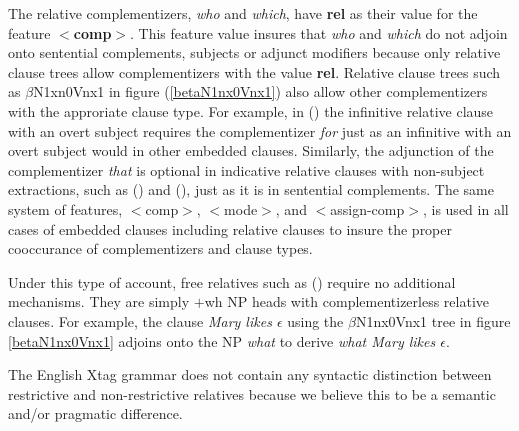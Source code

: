 The relative complementizers, {\it who} and {\it which}, have {\bf
rel} as their value for the feature {\bf $<$comp$>$}. This feature
value insures that {\it who} and {\it which} do not adjoin onto
sentential complements, subjects or adjunct modifiers because only
relative clause trees allow complementizers with the value {\bf rel}.
Relative clause trees such as $\beta$N1xn0Vnx1 in figure
(\ref{betaN1nx0Vnx1}) also allow other complementizers with the
approriate clause type. For example, in () the infinitive
relative clause with an overt subject requires the complementizer {\it
for} just as an infinitive with an overt subject would in other
embedded clauses. Similarly, the adjunction of the complementizer {\it
that} is optional in indicative relative clauses with non-subject
extractions, such as () and (), just as it is in
sentential complements. The same system of features, $<$comp$>$,
$<$mode$>$, and $<$assign-comp$>$, is used in all cases of embedded
clauses including relative clauses to insure the proper cooccurance of
complementizers and clause types.

Under this type of account, free relatives such as () require
no additional mechanisms. They are simply $+$wh NP heads with
complementizerless relative clauses. For example, the clause {\it Mary likes
$\epsilon$} using the $\beta$N1nx0Vnx1 tree in figure
\ref{betaN1nx0Vnx1} adjoins onto the NP {\it what} to derive {\it
what Mary likes $\epsilon$}.

The English Xtag grammar does not contain any  syntactic distinction between
restrictive and non-restrictive relatives because we believe this to
be a semantic and/or pragmatic difference.
